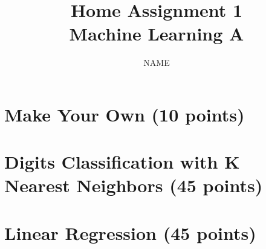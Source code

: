 \documentclass[a4paper,12pt]{article}
\title{Home Assignment 1\\Machine Learning A}
\author{NAME}
\begin{document}
\maketitle

\section{Make Your Own (10 points)}

\section{Digits Classification with K Nearest Neighbors (45 points)}

\section{Linear Regression (45 points)}
\end{document}
